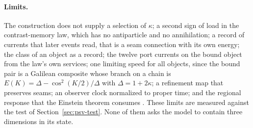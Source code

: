 \paragraph{Limits.}
The construction does not supply a selection of $\kappa$; a second sign of load in the
contrast-memory law, which has no antiparticle and no annihilation; a record of currents
that later events read, that is a
seam connection with its own energy; the class of an object as a record; the twelve port
currents on the bound object from the law's own services; one limiting speed for all
objects, since the bound pair is a Galilean composite whose branch on a chain is
$E(K)=\Delta-\cos^2(K/2)/\Delta$ with $\Delta=1+2\kappa$; a refinement map that preserves
seams; an observer clock normalized to proper time; and the regional response that the
Einstein theorem consumes \cite{ophEinstein}. These limits are measured against the test of
Section~\ref{sec:psv-test}. None of them asks the model to contain three dimensions in its
state.
